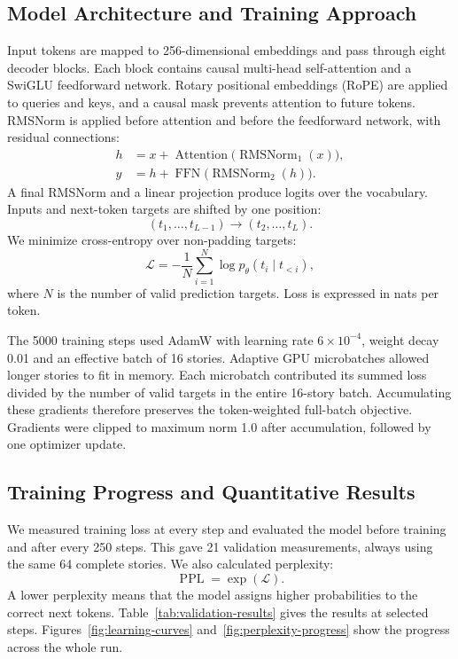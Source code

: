 \documentclass[a4paper, 12pt]{article}
\begin{document}
\subsection{Model Architecture and Training Approach}

Input tokens are mapped to 256-dimensional embeddings and pass through
eight decoder blocks. Each block contains causal multi-head
self-attention and a SwiGLU feedforward network. Rotary positional
embeddings (RoPE) are applied to queries and keys, and a causal mask
prevents attention to future tokens. RMSNorm is applied before attention
and before the feedforward network, with residual connections:
\begin{align}
    h &= x + \operatorname{Attention}
        \bigl(\operatorname{RMSNorm}_1(x)\bigr), \\
    y &= h + \operatorname{FFN}
        \bigl(\operatorname{RMSNorm}_2(h)\bigr).
\end{align}
A final RMSNorm and a linear projection produce logits over the vocabulary. Inputs and next-token targets are shifted by one position:
\[
    (t_1,\ldots,t_{L-1})
    \longrightarrow
    (t_2,\ldots,t_L).
\]
We minimize cross-entropy over non-padding targets:
\[
    \mathcal{L}
    = -\frac{1}{N}\sum_{i=1}^{N}
    \log p_{\theta}(t_i \mid t_{<i}),
\]
where $N$ is the number of valid prediction targets. Loss is expressed
in nats per token.

The 5000 training steps used AdamW with learning rate $6\times10^{-4}$, weight decay
0.01 and an effective batch of 16 stories. Adaptive GPU microbatches
allowed longer stories to fit in memory. Each microbatch contributed
its summed loss divided by the number of valid targets in the entire
16-story batch. Accumulating these gradients therefore preserves the
token-weighted full-batch objective. Gradients were clipped to maximum
norm 1.0 after accumulation, followed by one optimizer update.

\subsection{Training Progress and Quantitative Results}

We measured training loss at every step and evaluated the model before
training and after every 250 steps. This gave 21 validation measurements,
always using the same 64 complete stories. We also calculated perplexity:
\[
    \operatorname{PPL}=\exp(\mathcal{L}).
\]
A lower perplexity means that the model assigns higher probabilities to
the correct next tokens. Table~\ref{tab:validation-results} gives the results at selected steps.
Figures~\ref{fig:learning-curves} and~\ref{fig:perplexity-progress} show
the progress across the whole run.
\end{document}
